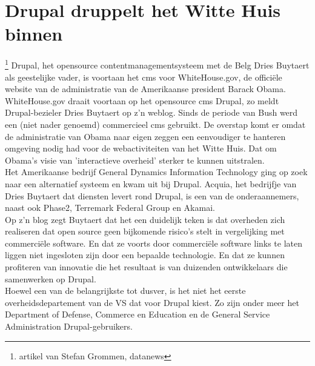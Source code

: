 \section{Drupal druppelt het Witte Huis binnen } 
\footnote {artikel van Stefan Grommen, datanews}
Drupal, het opensource contentmanagementsysteem met de Belg Dries Buytaert
 als geestelijke vader, is voortaan het cms voor
WhiteHouse.gov, de offici\"ele website van de administratie van de Amerikaanse president Barack Obama.
\\
WhiteHouse.gov draait voortaan op het opensource cms Drupal, zo meldt Drupal-bezieler 
Dries Buytaert op z'n weblog. Sinds de periode van Bush werd een (niet nader genoemd) 
commercieel cms gebruikt. De overstap komt er omdat de administratie van Obama naar 
eigen zeggen een eenvoudiger te hanteren omgeving nodig had voor de webactiviteiten 
van het Witte Huis. Dat om Obama's visie van 'interactieve overheid' sterker te kunnen uitstralen.
\\
Het Amerikaanse bedrijf General Dynamics Information Technology ging 
op zoek naar een alternatief systeem en kwam uit bij Drupal. Acquia, 
het bedrijfje van Dries Buytaert dat diensten levert rond Drupal, 
is een van de onderaannemers, naast ook Phase2, Terremark Federal Group en Akamai.
\\
Op z'n blog zegt Buytaert dat het een duidelijk teken is dat overheden 
zich realiseren dat open source geen bijkomende risico's stelt in 
vergelijking met commerci\"ele software. En dat ze voorts door commerci\"ele 
software links te laten liggen niet ingesloten zijn door een bepaalde 
technologie. En dat ze kunnen profiteren van innovatie die het resultaat 
is van duizenden ontwikkelaars die samenwerken op Drupal.
\\
Hoewel een van de belangrijkste tot dusver, is het niet het eerste 
overheidsdepartement van de VS dat voor Drupal kiest. Zo zijn onder meer 
het Department of Defense, Commerce en Education en de General Service 
Administration Drupal-gebruikers.

